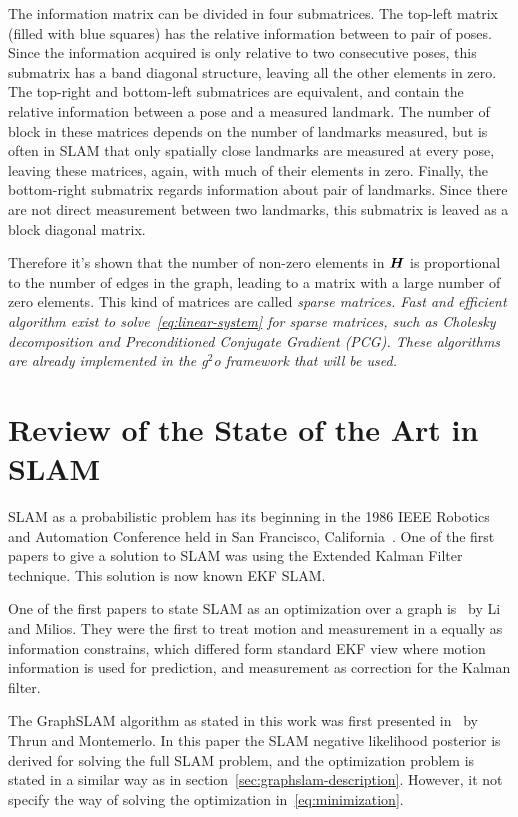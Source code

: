 The information matrix can be divided in four submatrices. The top-left matrix (filled with blue squares) has the relative information between to pair of poses. Since the information acquired is only relative to two consecutive poses, 
this submatrix has a band diagonal structure, leaving all the other elements in zero. The top-right and bottom-left submatrices are equivalent, and contain the relative information between a pose and a measured landmark. The number of block in these matrices depends on the number of landmarks measured, but is often in SLAM that only spatially close landmarks are measured at every pose, leaving these matrices, again, with much of their elements in zero. Finally, the bottom-right submatrix regards information about pair of landmarks. Since there are not direct measurement between two landmarks, this submatrix is leaved as a block diagonal matrix.

Therefore it's shown that the number of non-zero elements in $\boldsymbol{H}$ is proportional to the number of edges in the graph, leading to a matrix with a large number of zero elements. This kind of matrices are called \it{sparse matrices}. Fast and efficient algorithm exist to solve~\eqref{eq:linear-system} for sparse matrices, such as Cholesky decomposition and Preconditioned Conjugate Gradient (PCG). These algorithms are already implemented in the g$^2$o framework that will be used.

\section{Review of the State of the Art in SLAM}
\label{sec:state-of-the-art}

SLAM as a probabilistic problem has its beginning in the 1986 IEEE Robotics and Automation Conference held in San Francisco, California~\cite{tutorial}. One of the first papers to give a solution to SLAM was \cite{ekfslam} using the Extended Kalman Filter technique. This solution is now known EKF SLAM.

One of the first papers to state SLAM as an optimization over a graph is~\cite{firstgraph} by Li and Milios. They were the first to treat motion and measurement in a equally as information constrains, which differed form standard EKF view where motion information is used for prediction, and measurement as correction for the Kalman filter.

The GraphSLAM algorithm as stated in this work was first presented in~\cite{graphslam} by Thrun and Montemerlo. In this paper the SLAM negative likelihood posterior is derived for solving the full SLAM problem, and the optimization problem is stated in a similar way as in section~\ref{sec:graphslam-description}. However, it not specify the way of solving the optimization in~\eqref{eq:minimization}. 

